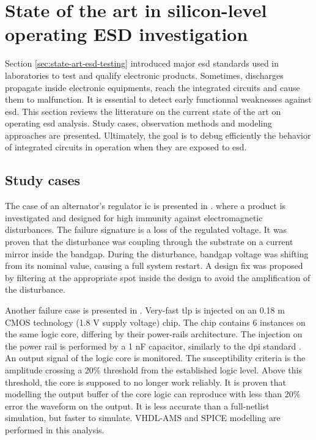 \section{State of the art in silicon-level operating ESD investigation}

Section \ref{sec:state-art-esd-testing} introduced major \gls{esd} standards used in laboratories to test and qualify electronic products.
Sometimes, discharges propagate inside electronic equipments, reach the integrated circuits and cause them to malfunction.
It is essential to detect early functionnal weaknesses against \gls{esd}.
This section reviews the litterature on the current state of the art on operating \gls{esd} analysis.
Study cases, observation methods and modeling approaches are presented.
Ultimately, the goal is to debug efficiently the behavior of integrated circuits in operation when they are exposed to \gls{esd}.

\subsection{Study cases}

The case of an alternator's regulator \gls{ic} is presented in \cite{softfailEMCIC}.
where a product is investigated and designed for high immunity against electromagnetic disturbances.
The failure signature is a loss of the regulated voltage.
It was proven that the disturbance was coupling through the substrate on a current mirror inside the bandgap.
During the disturbance, bandgap voltage was shifting from its nominal value, causing a full system restart.
A design fix was proposed by filtering at the appropriate spot inside the design to avoid the amplification of the disturbance.

Another failure case is presented in \cite{LacrampeTransientImmunity}.
Very-fast \gls{tlp} is injected on an 0.18 \textmu{}m CMOS technology (1.8 V supply voltage) chip.
The chip contains 6 instances on the same logic core, differing by their power-rails architecture.
The injection on the power rail is performed by a 1 nF capacitor, similarly to the \gls{dpi} standard \cite{iec62132-4}.
An output signal of the logic core is monitored.
The susceptibility criteria is the amplitude crossing a 20\% threshold from the established logic level.
Above this threshold, the core is supposed to no longer work reliably.
It is proven that modelling the output buffer of the core logic can reproduce with less than 20\% error the waveform on the output.
It is less accurate than a full-netlist simulation, but faster to simulate.
VHDL-AMS and SPICE modelling are performed in this analysis.

